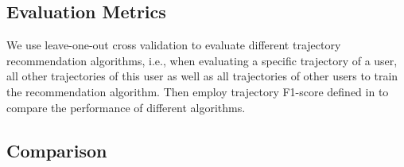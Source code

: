 \subsection{Evaluation Metrics}
\label{experiment:metric}
We use leave-one-out cross validation to evaluate different trajectory recommendation algorithms,
i.e., when evaluating a specific trajectory of a user, all other trajectories of this user as well as 
all trajectories of other users to train the recommendation algorithm.
Then employ trajectory F1-score defined in \cite{ijcai15} to compare the performance of different algorithms.


\subsection{Comparison}
\label{experiment:comparison}

